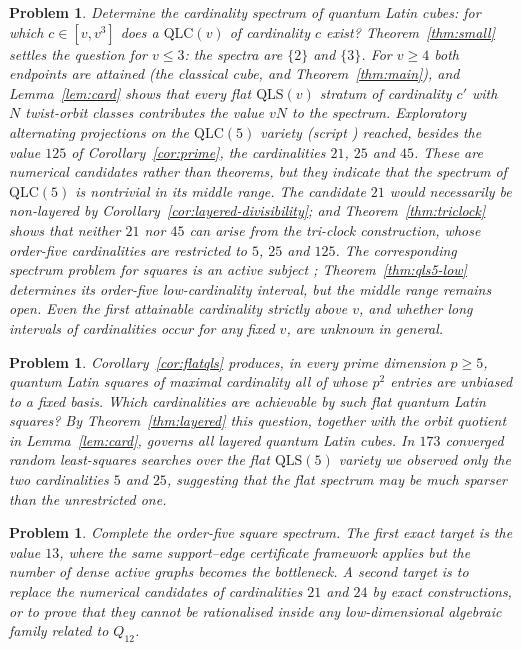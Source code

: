 \documentclass[11pt]{amsart}
\newtheorem{problem}[theorem]{Problem}
\theoremstyle{definition}
\newcommand{\QLS}{\mathrm{QLS}}
\newcommand{\QLC}{\mathrm{QLC}}
\begin{document}
\begin{problem}\label{prob:spectrum}
Determine the \emph{cardinality spectrum} of quantum Latin cubes: for which
$c\in[v,v^3]$ does a $\QLC(v)$ of cardinality $c$ exist?
Theorem~\ref{thm:small} settles the question for $v\le3$: the spectra are
$\{2\}$ and $\{3\}$.  For $v\ge4$ both endpoints are attained (the
classical cube, and Theorem~\ref{thm:main}), and Lemma~\ref{lem:card}
shows that every flat $\QLS(v)$ stratum of cardinality $c'$ with $N$
twist-orbit classes contributes the value $vN$ to the spectrum.  Exploratory
alternating projections on the $\QLC(5)$ variety (script
) reached, besides the value $125$ of
Corollary~\ref{cor:prime}, the cardinalities $21$, $25$ and $45$.  These
are numerical candidates rather than theorems, but they indicate that the
spectrum of $\QLC(5)$ is nontrivial in its middle range.  The candidate
$21$ would necessarily be non-layered by
Corollary~\ref{cor:layered-divisibility}; and Theorem~\ref{thm:triclock}
shows that neither $21$ nor $45$ can arise from the tri-clock construction,
whose order-five cardinalities are restricted to $5$, $25$ and $125$.  The
corresponding spectrum problem for squares is an active subject
\cite{Paczos2021,ZWJ2026,ZhangJi2026}; Theorem~\ref{thm:qls5-low} determines
its order-five low-cardinality interval, but the middle range remains open.
Even the first attainable cardinality strictly above $v$, and whether long
intervals of cardinalities occur for any fixed $v$, are unknown in general.
\end{problem}

\begin{problem}\label{prob:flat-spectrum}
Corollary~\ref{cor:flatqls} produces, in every prime dimension $p\ge5$,
quantum Latin squares of maximal cardinality all of whose $p^2$ entries
are unbiased to a fixed basis.  Which cardinalities are achievable by such
\emph{flat} quantum Latin squares?  By Theorem~\ref{thm:layered} this
question, together with the orbit quotient in Lemma~\ref{lem:card}, governs
all layered quantum Latin cubes.  In $173$ converged
random least-squares searches over the flat $\QLS(5)$ variety we observed
only the two cardinalities $5$ and $25$, suggesting that the flat spectrum
may be much sparser than the unrestricted one.
\end{problem}

\begin{problem}\label{prob:qls5-middle}
Complete the order-five square spectrum.  The first exact target is the
value $13$, where the same support--edge certificate framework applies but
the number of dense active graphs becomes the bottleneck.  A second target
is to replace the numerical candidates of cardinalities $21$ and $24$ by exact
constructions, or to prove that they cannot be rationalised inside any
low-dimensional algebraic family related to $Q_{12}$.
\end{problem}
\end{document}
